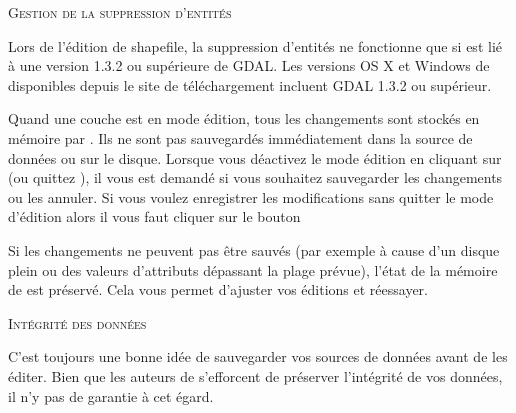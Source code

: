 \begin{Tip}[ht]\caption{\textsc{Gestion de la suppression d'entités}}
Lors de l'édition de shapefile, la suppression d'entités ne fonctionne que si 
\qg est lié à une version 1.3.2 ou supérieure de GDAL. Les versions OS X et 
Windows de \qg disponibles depuis le site de téléchargement incluent GDAL 1.3.2 
ou supérieur.
\end{Tip}


Quand une couche est en mode édition, tous les changements sont stockés en 
mémoire par \qg. Ils ne sont pas sauvegardés immédiatement dans la source de 
données ou sur le disque. Lorsque vous déactivez le mode édition en cliquant 
sur (ou quittez \qg), 
il vous est demandé si vous souhaitez sauvegarder les changements ou les annuler. 
Si vous voulez enregistrer les modifications sans quitter le mode d'édition 
alors il vous faut cliquer sur le bouton 

Si les changements ne peuvent pas être sauvés (par exemple à cause d'un disque 
plein ou des valeurs d'attributs dépassant la plage prévue), l'état de la 
mémoire de \qg est préservé. Cela vous permet d'ajuster vos éditions et réessayer.

\begin{Tip}[ht]\caption{\textsc{Intégrité des données}}
C'est toujours une bonne idée de sauvegarder vos sources de données avant de les 
éditer. Bien que les auteurs de \qg s'efforcent de préserver l'intégrité de vos 
données, il n'y pas de garantie à cet égard.
\end{Tip}

